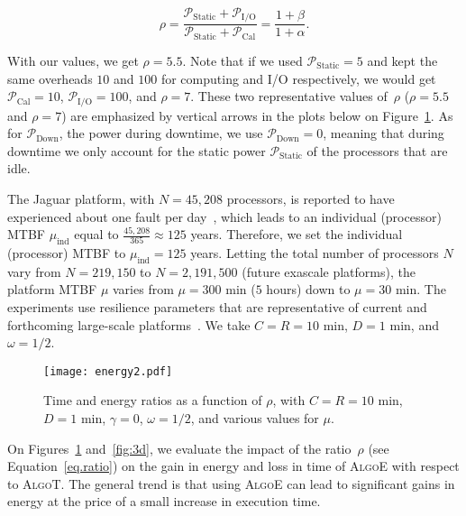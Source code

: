 \documentclass[a4paper]{article}
\newcommand{\ema}[1]{\ensuremath{#1}\xspace}
\newcommand{\ccc}{\ema{C}}
\newcommand{\rrr}{\ema{R}}
\newcommand{\ddd}{\ema{D}}
\newcommand{\power}[1][]{\ema{\mathcal{P}_{\text{#1}}}}
\newcommand{\pCal}{\power[Cal]}
\newcommand{\pIO}{\power[I/O]}
\newcommand{\pDown}{\power[Down]}
\newcommand{\pIdle}{\power[Static]}
\newcommand{\pStatic}{\power[Static]}
\newcommand{\workduringckpt}{\omega}
\newcommand{\cosi}{\alpha}
\newcommand{\ios}{\beta}
\newcommand{\dos}{\gamma}
\newcommand{\ratio}{\rho}
\newcommand{\algoE}{\textsc{AlgoE}\xspace}
\newcommand{\algoT}{\textsc{AlgoT}\xspace}
\begin{document}
\begin{equation}
\label{eq.ratio}
\ratio = \frac{\pStatic +\pIO}{\pStatic+\pCal} = \frac{1 + \ios}{1 + \cosi} .
\end{equation}

With our values,  we get $\ratio=5.5$. 
Note that if we used $\pIdle = 5$ and kept the same overheads
$10$ and $100$ for computing and I/O respectively, we would get $\pCal = 10$,
$\pIO = 100$, and $\ratio =  7$. These two representative 
values of~$\ratio$ ($\ratio = 5.5$ and $\ratio=7$) are emphasized 
by vertical arrows in the plots below on Figure~\ref{fig:energytime}.
As for $\pDown$, the power during downtime, we use $\pDown = 0$, meaning that during downtime we only
account for the static power \pStatic of the processors that are idle.


The Jaguar platform, with $N=45,208$ processors, is
reported to have experienced about one fault per day~\cite{6264677},
which leads to an individual (processor) MTBF $\mu_{\text{ind}}$ equal
to $\frac{45,208}{365}\approx 125$ years. Therefore, we set the
individual (processor) MTBF to $\mu_{\text{ind}} = 125$ years. Letting
the total number of processors $N$ vary from $N=219,150$ to
$N=2,191,500$ (future exascale platforms), the platform MTBF $\mu$ varies 
from $\mu=300$ min ($5$ hours) down to $\mu=30$ min.
The experiments use resilience parameters that are representative of current and forthcoming
large-scale platforms~\cite{Ferreira2011,j116}.  We take $\ccc=\rrr=10$ min,  
$\ddd=1$ min, and $\workduringckpt=1/2$.



\begin{figure}[t]
    \centering
    \texttt{[image: energy2.pdf]}
    \caption{Time and energy ratios as a function of $\ratio$,
with $C=R=10$ min, $D=1$ min, $\dos=0$, $\workduringckpt=1/2$,
      and various values for $\mu$.}
    \label{fig:energytime}
\end{figure}


On Figures~\ref{fig:energytime} and~\ref{fig:3d}, we evaluate the impact of the 
ratio~$\ratio$ (see Equation~\eqref{eq.ratio}) on the gain 
in energy and loss in time of \algoE with respect to \algoT. The general trend is that using 
\algoE can lead to significant gains in energy at the price of a small increase in execution time.
\end{document}
